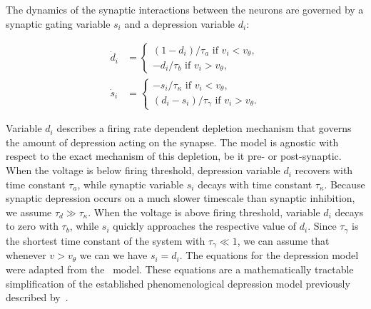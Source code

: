 \documentclass[../manuscript.tex]{subfiles}
\begin{document}
The dynamics of the synaptic interactions between the neurons are governed by a synaptic
gating variable $s_{i}$ and a depression variable $d_{i}$:
\begin{linenomath}
  \begin{align}
    \dot d_{i} & =
    \begin{cases}
      (1-d_{i})/\tau_a\text{ if }v_i<v_\theta, \\
      -d_{i}/\tau_b\text{ if }v_i>v_\theta,
    \end{cases}\label{eq:dot-d} \\
    \dot s_{i} & =
    \begin{cases}
      -s_i/\tau_\kappa\text{ if }v_i<v_\theta, \\
      (d_i-s_i)/\tau_\gamma\text{ if }v_i>v_\theta.
    \end{cases}\label{eq:dot-s}
  \end{align}
\end{linenomath}
Variable $d_{i}$ describes a firing rate dependent depletion mechanism that governs the amount of depression acting on the synapse.
The model is agnostic with respect to the exact mechanism of this depletion, be it pre- or post-synaptic.
When the voltage is below firing threshold, depression variable $d_i$ recovers with time constant $\tau_a$, while synaptic variable $s_i$ decays with time constant $\tau_\kappa$.
Because synaptic depression occurs on a much slower timescale than synaptic inhibition, we assume $\tau_d\gg\tau_\kappa$.
When the voltage is above firing threshold, variable $d_i$ decays to zero with $\tau_b$, while $s_i$ quickly approaches the respective value of $d_i$.
Since $\tau_\gamma$ is the shortest time constant of the system with $\tau_\gamma \ll 1$, we can assume that whenever $v>v_\theta$ we can we have $s_i=d_i$.
The equations for the depression model were adapted from the~\citet{bose2001} model.
These equations are a mathematically tractable simplification of the established phenomenological depression model previously described by~\citet{tsodyks1997}.
\end{document}
